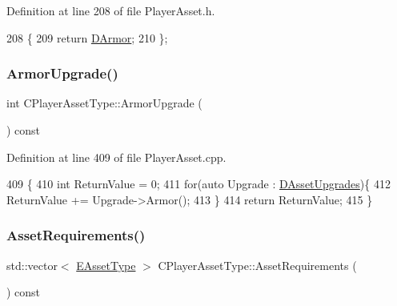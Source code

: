Definition at line 208 of file Player\+Asset.\+h.


\begin{DoxyCode}
208                          \{
209             \textcolor{keywordflow}{return} \hyperlink{classCPlayerAssetType_ac211254f807a497099509a3e96f7185a}{DArmor};  
210         \};
\end{DoxyCode}
\hypertarget{classCPlayerAssetType_a976e906f40a84bfa3e675d563e7eb422}{}\label{classCPlayerAssetType_a976e906f40a84bfa3e675d563e7eb422} 
\subsubsection{\texorpdfstring{Armor\+Upgrade()}{ArmorUpgrade()}}
{\footnotesize\ttfamily int C\+Player\+Asset\+Type\+::\+Armor\+Upgrade (\begin{DoxyParamCaption}{ }\end{DoxyParamCaption}) const}



Definition at line 409 of file Player\+Asset.\+cpp.


\begin{DoxyCode}
409                                         \{
410     \textcolor{keywordtype}{int} ReturnValue = 0;
411     \textcolor{keywordflow}{for}(\textcolor{keyword}{auto} Upgrade : \hyperlink{classCPlayerAssetType_aeb8d5c3ea81ea56248d02a5e24d48001}{DAssetUpgrades})\{
412         ReturnValue += Upgrade->Armor();
413     \}
414     \textcolor{keywordflow}{return} ReturnValue;
415 \}
\end{DoxyCode}
\hypertarget{classCPlayerAssetType_a8041f92f246b58867a4478b3a47a7b74}{}\label{classCPlayerAssetType_a8041f92f246b58867a4478b3a47a7b74} 
\subsubsection{\texorpdfstring{Asset\+Requirements()}{AssetRequirements()}}
{\footnotesize\ttfamily std\+::vector$<$ \hyperlink{GameDataTypes_8h_a5600d4fc433b83300308921974477fec}{E\+Asset\+Type} $>$ C\+Player\+Asset\+Type\+::\+Asset\+Requirements (\begin{DoxyParamCaption}{ }\end{DoxyParamCaption}) const\hspace{0.3cm}{\ttfamily [inline]}}



